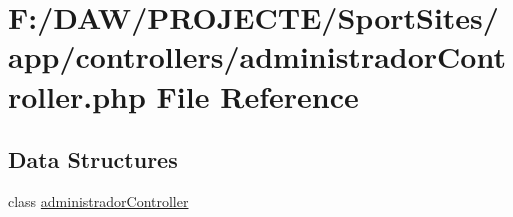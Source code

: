 \hypertarget{administrador_controller_8php}{}\section{F\+:/\+D\+A\+W/\+P\+R\+O\+J\+E\+C\+T\+E/\+Sport\+Sites/app/controllers/administrador\+Controller.php File Reference}
\label{administrador_controller_8php}
\subsection*{Data Structures}
\begin{DoxyCompactItemize}
\item 
class \hyperlink{classadministrador_controller}{administrador\+Controller}
\end{DoxyCompactItemize}
